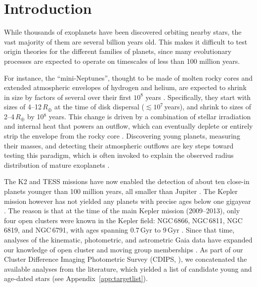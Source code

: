 \documentclass[12pt,modern,twocolumn,tighten]{aastex63}
\begin{document}



\section{Introduction}

While thousands of exoplanets have been discovered orbiting nearby
stars, the vast majority of them are several billion years old.  This
makes it difficult to test origin theories for the different
families of planets, since many evolutionary processes are expected to
operate on timescales of less than 100 million years.

For instance, the ``mini-Neptunes'', thought to be made of
molten rocky cores \citep{kite_atmosphere_2020} and extended atmospheric envelopes of hydrogen and
helium, are expected to shrink in size by factors of several over
their first $10^8$ years
\citep{owen_constraining_2020}.  Specifically,
they start with sizes of 4--12\,$R_\oplus$ at the time of disk
dispersal ($\lesssim$$10^7$\,years), and shrink to sizes of
2--4\,$R_\oplus$ by 10$^8$ years.  This change is driven by a
combination of stellar irradiation and internal heat that powers an
outflow, which can eventually deplete or entirely strip the envelope
from the rocky core \citep{Owen_Wu_2013,ginzburg_corepowered_2018}.
Discovering young planets, measuring their masses, and detecting their
atmospheric outflows are key steps toward testing this paradigm, which
is often invoked to explain the observed radius distribution of mature
exoplanets \citep{Fulton_et_al_2017}.

The K2 and TESS missions have now enabled the detection of about ten
close-in planets younger than 100 million years, all smaller than
Jupiter
\citep{Mann_K2_33b_2016,David_et_al_2017,david_four_2019,newton_tess_2019,bouma_cluster_2020,plavchan_planet_2020,rizzuto_tess_2020}.
The Kepler mission however has not yielded any planets with precise
ages below one gigayear \citep{Meibom_et_al_2013}.  The reason is that
at the time of the main Kepler mission (2009--2013), only four open
clusters were known in the Kepler field: NGC\,6866, NGC\,6811,
NGC\,6819, and NGC\,6791, with ages spanning 0.7\,Gyr to 9\,Gyr
\citep{meibom_kepler_2011}.  Since that time, analyses of the
kinematic, photometric, and astrometric Gaia data have expanded our
knowledge of open cluster and moving group memberships \citep[{\it
e.g.},][]{cantatgaudin_gaia_2018,zari_3d_2018,kounkel_untangling_2019,Meingast2021,kerr_stars_2021}.
As part of our Cluster Difference Imaging Photometric Survey (CDIPS,
\citealt{bouma_cdipsI_2019}), we concatenated the available analyses
from the literature, which yielded a list of candidate young and
age-dated stars (see Appendix~\ref{app:targetlist}).
\end{document}
